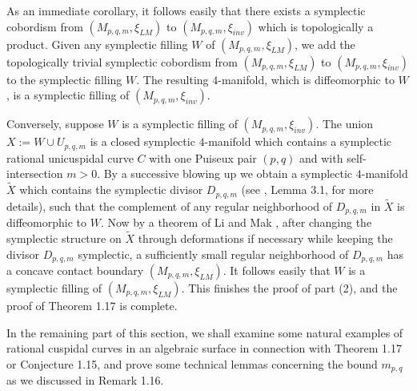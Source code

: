 \documentclass[11pt]{amsart}
\theoremstyle{plain}
\numberwithin{theorem}{section}
\theoremstyle{definition}
\begin{document}
As an immediate corollary, it follows easily that there exists a symplectic cobordism from 
$(M_{p,q,m},\xi_{LM})$ to $(M_{p,q,m},\xi_{inv})$ which is topologically a product. Given any symplectic filling $W$ of $(M_{p,q,m},\xi_{LM})$, we add the topologically trivial symplectic cobordism from 
$(M_{p,q,m},\xi_{LM})$ to $(M_{p,q,m},\xi_{inv})$ to the symplectic filling $W$. The resulting $4$-manifold, which is diffeomorphic to $W$, is a symplectic filling of $(M_{p,q,m},\xi_{inv})$. 


Conversely, suppose $W$ is a symplectic filling of $(M_{p,q,m},\xi_{inv})$. The union 
$X:=W\cup U_{p,q,m}$ is a closed symplectic $4$-manifold which contains a symplectic rational unicuspidal curve
$C$ with one Puiseux pair $(p,q)$ and with self-intersection $m>0$. By a successive blowing up we obtain a
symplectic $4$-manifold $\tilde{X}$ which contains the symplectic divisor $D_{p,q,m}$
(see \cite{C5}, Lemma 3.1, for more details), such that the complement of any regular neighborhood of $D_{p,q,m}$ in $\tilde{X}$ is diffeomorphic to $W$. Now by a theorem of Li and Mak \cite{LM}, after changing the symplectic structure on $\tilde{X}$ through deformations if necessary while keeping the divisor $D_{p,q,m}$ symplectic, a sufficiently small regular neighborhood of $D_{p,q,m}$ has a concave contact boundary $(M_{p,q,m},\xi_{LM})$. It follows easily that $W$ is a symplectic filling of $(M_{p,q,m},\xi_{LM})$. This finishes the proof of part (2), and the proof of Theorem 1.17 is complete.

\vspace{2mm}



In the remaining part of this section, we shall examine some natural examples of rational cuspidal curves in
an algebraic surface in connection with Theorem 1.17 or Conjecture 1.15, and prove some technical lemmas 
concerning the bound $m_{p,q}$ as we discussed in Remark 1.16.
\end{document}
